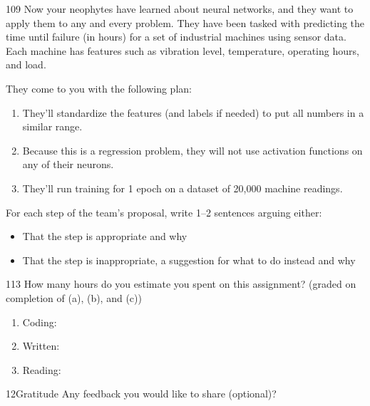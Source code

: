 \documentclass[11pt]{article}
\begin{document}
\begin{studentanswer}[30]
\end{studentanswer}


\newpage


\begin{problem}{10}{9}
Now your neophytes have learned about neural networks, and they want to apply them to any and every problem. They have been tasked with predicting the time until failure (in hours) for a set of industrial machines using sensor data. Each machine has features such as vibration level, temperature, operating hours, and load. 

They come to you with the following plan:

\begin{enumerate}[label=(\alph*)]
\item They'll standardize the features (and labels if needed) to put all numbers in a similar range.
\item Because this is a regression problem, they will not use activation functions on any of their neurons.
\item They'll run training for 1 epoch on a dataset of 20,000 machine readings.
\end{enumerate}



For each step of the team’s proposal, write 1–2 sentences arguing either:
\begin{itemize}
    \item That the step is appropriate and why
    \item That the step is inappropriate, a suggestion for what to do instead and why
\end{itemize}



\end{problem}

\begin{studentanswer}[30]
\end{studentanswer}






\begin{problem}{11}{3}
How many hours do you estimate you spent on this assignment? (graded on completion of (a), (b), and (c))
\begin{enumerate}[label=(\alph*)]
    \item Coding: \\
    \item Written: \\
    \item Reading: \\
\end{enumerate}
\end{problem}

\begin{studentanswer}[6]
\end{studentanswer}



\begin{problem}{12}{Gratitude}
Any feedback you would like to share (optional)?
\end{problem}

\begin{studentanswer}[4]

\end{studentanswer}
\end{document}
